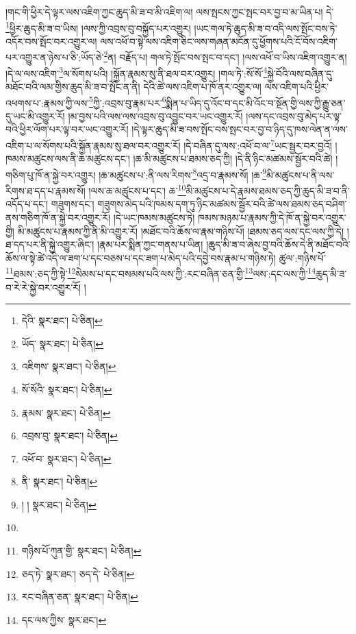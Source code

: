 །གང་གི་ཕྱིར་དེ་ལྟར་ལས་འཇིག་ཀྱང་ཆུད་མི་ཟ་བ་མི་འཇིག་ལ། ལས་སྤངས་ཀྱང་སྤང་བར་བྱ་བ་མ་ཡིན་པ། དེ་\footnote{དེའི་  སྣར་ཐང་།  པེ་ཅིན། }ཕྱིར་ཆུད་མི་ཟ་བ་ཡིས། །ལས་ཀྱི་འབྲས་བུ་བསྐྱོད་པར་འགྱུར། །ཡང་གལ་ཏེ་ཆུད་མི་ཟ་བ་འདི་ལས་སྤོང་བས་ཏེ་འདོར་བས་སྤོང་བར་འགྱུར་ལ། ལས་འཕོ་བ་སྟེ་ལས་འཇིག་ཅིང་ལས་གཞན་མངོན་དུ་ཕྱོགས་པའི་ངོ་བོས་འཇིག་པར་འགྱུར་ན་ཉེས་པ་ཅི་:ཡོད་ཅེ་\footnote{ཡོད་  སྣར་ཐང་།  པེ་ཅིན། }ན། བརྗོད་པ། གལ་ཏེ་སྤོང་བས་སྤང་བ་དང་། །ལས་འཕོ་བ་ཡིས་འཇིག་འགྱུར་ན། །དེ་ལ་ལས་འཇིག་\footnote{འཇིགས་  སྣར་ཐང་།  པེ་ཅིན། }ལ་སོགས་པའི། །སྐྱོན་རྣམས་སུ་ནི་ཐལ་བར་འགྱུར། །གལ་ཏེ་:སོ་སོ་\footnote{སོ་སོའི་  སྣར་ཐང་།  པེ་ཅིན། }སྐྱེ་བོའི་ལས་བཞིན་དུ་མཐོང་བའི་ལམ་གྱིས་ཆུད་མི་ཟ་བ་སྤོང་ན་ནི། དེའི་ཚེ་ལས་འཇིག་པ་ཁོ་ནར་འགྱུར་ལ། ལས་འཇིག་པའི་ཕྱིར་འཕགས་པ་:རྣམས་ཀྱི་ལས་\footnote{རྣམས་  སྣར་ཐང་།  པེ་ཅིན། }ཀྱི་:འབྲས་བུ་རྣམ་པར་\footnote{འབྲས་བུ་  སྣར་ཐང་།  པེ་ཅིན། }སྨིན་པ་ཡིད་དུ་འོང་བ་དང་མི་འོང་བ་སྔོན་གྱི་ལས་ཀྱི་རྒྱུ་ཅན་དུ་ཡང་མི་འགྱུར་རོ། །མ་བྱས་པའི་ལས་ལས་འབྲས་བུ་འབྱུང་བར་ཡང་འགྱུར་རོ། །ལས་དང་འབྲས་བུ་མེད་པར་ལྟ་བའི་ཕྱིར་ལོག་པར་ལྟ་བར་ཡང་འགྱུར་རོ། །དེ་ལྟར་ཆུད་མི་ཟ་བས་སྤོང་བས་སྤང་བར་བྱ་བ་ཉིད་དུ་ཁས་ལེན་ན་ལས་འཇིག་པ་ལ་སོགས་པའི་སྐྱོན་རྣམས་སུ་ཐལ་བར་འགྱུར་རོ། །དེ་བཞིན་དུ་ལས་:འཕོ་བ་ལ་\footnote{འཕོ་བ་  སྣར་ཐང་།  པེ་ཅིན། }ཡང་སྦྱར་བར་བྱའོ། །ཁམས་མཚུངས་ལས་ནི་ཆ་མཚུངས་དང་། །ཆ་མི་མཚུངས་པ་ཐམས་ཅད་ཀྱི། །དེ་ནི་ཉིང་མཚམས་སྦྱོར་བའི་ཚེ། །གཅིག་པུ་ཁོ་ན་སྐྱེ་བར་འགྱུར། །ཆ་མཚུངས་པ་:ནི་ལས་རིགས་\footnote{ནི་  སྣར་ཐང་།  པེ་ཅིན། }འདྲ་བ་རྣམས་སོ། །ཆ་\footnote{། །  སྣར་ཐང་།  པེ་ཅིན། }མི་མཚུངས་པ་ནི་ལས་རིགས་ཐ་དད་པ་རྣམས་སོ། །ལས་ཆ་མཚུངས་པ་དང་། ཆ་\footnote{}མི་མཚུངས་པ་དེ་རྣམས་ཐམས་ཅད་ཀྱི་ཆུད་མི་ཟ་བ་ནི་འདོད་པ་དང་། གཟུགས་དང་། གཟུགས་མེད་པའི་ཁམས་དག་ཏུ་ཉིང་མཚམས་སྦྱོར་བའི་ཚེ་ལས་ཐམས་ཅད་བཤིག་ནས་གཅིག་ཁོ་ན་སྐྱེ་བར་འགྱུར་རོ། །དེ་ཡང་ཁམས་མཚུངས་ཏེ། ཁམས་མཉམ་པ་རྣམས་ཀྱི་དེ་ཁོ་ན་སྐྱེ་བར་འགྱུར་གྱི། མི་མཚུངས་པ་རྣམས་ཀྱི་ནི་མི་འགྱུར་རོ། །མཐོང་བའི་ཆོས་ལ་རྣམ་གཉིས་པོ། །ཐམས་ཅད་ལས་དང་ལས་ཀྱི་དེ། །ཐ་དད་པར་ནི་སྐྱེ་འགྱུར་ཞིང་། །རྣམ་པར་སྨིན་ཀྱང་གནས་པ་ཡིན། །ཆུད་མི་ཟ་བ་ཞེས་བྱ་བའི་ཆོས་དེ་ནི་མཐོང་བའི་ཆོས་ལ་སྟེ་ཚེ་འདི་ལ་ཟག་པ་དང་བཅས་པ་དང་ཟག་པ་མེད་པའི་དབྱེ་བས་རྣམ་པ་གཉིས་ཏེ། ཚུལ་:གཉིས་པོ་\footnote{གཉིས་པོ་ཀུན་གྱི་  སྣར་ཐང་།  པེ་ཅིན། }ཐམས་:ཅད་ཀྱི་སྟེ་\footnote{ཅད་ཏེ་  སྣར་ཐང་། ཅད་དེ་  པེ་ཅིན། }སེམས་པ་དང་བསམས་པའི་ལས་ཀྱི་:རང་བཞིན་ཅན་གྱི་\footnote{རང་བཞིན་ཅན་  སྣར་ཐང་།  པེ་ཅིན། }ལས་:དང་ལས་ཀྱི་\footnote{དང་ལས་ཀྱིས་  སྣར་ཐང་། }ཆུད་མི་ཟ་བ་རེ་རེ་སྐྱེ་བར་འགྱུར་རོ། །
